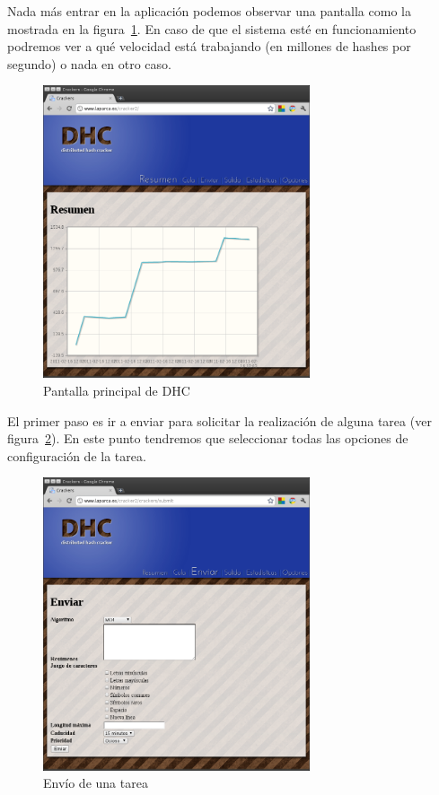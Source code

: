 Nada más entrar en la aplicación podemos observar una pantalla como la mostrada en la figura~\ref{fig:DHC_principal}. En caso de que el sistema esté en funcionamiento podremos ver a qué velocidad está trabajando (en millones de hashes por segundo) o nada en otro caso.

\begin{figure}
	\centering
	\includegraphics[width=0.7\textwidth]{images/resumen.png}
	\caption{Pantalla principal de DHC}\label{fig:DHC_principal}
\end{figure}

El primer paso es ir a enviar para solicitar la realización de alguna tarea (ver figura~\ref{fig:DHC_enviar}). En este punto tendremos que seleccionar todas las opciones de configuración de la tarea.

\begin{figure}
	\centering
	\includegraphics[width=0.7\textwidth]{images/dhc_enviar.png}
	\caption{Envío de una tarea}\label{fig:DHC_enviar}
\end{figure}


